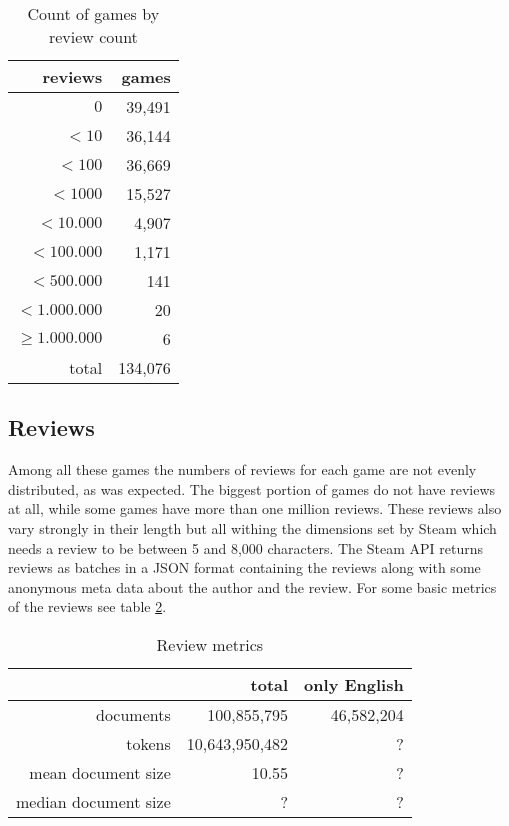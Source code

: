 \documentclass[11pt, a4paper]{article}
\begin{document}
\begin{table}[h]
    \centering
    \begin{tabular}{r|r}
reviews & games \\\hline
    $0$ & 39,491\\
    $< 10$  & 36,144\\
    $< 100$ & 36,669 \\
    $< 1000$ & 15,527\\
    $< 10.000$ & 4,907 \\
    $< 100.000$ & 1,171\\
    $< 500.000$ & 141 \\
    $< 1.000.000$ & 20\\
    $\geq1.000.000$ & 6\\\hline
    total &  134,076
\end{tabular}
    \caption{Count of games by review count}
    \label{tab:game_metrics}
\end{table}


\subsection{Reviews}
Among all these games the numbers of reviews for each game are not evenly distributed, as was expected. The biggest portion of games do not have reviews at all, while some games have more than one million reviews. These reviews also vary strongly in their length but all withing the dimensions set by Steam which needs a review to be between 5 and 8,000 characters. The Steam API returns reviews as batches in a JSON format containing the reviews along with some anonymous meta data about the author and the review. For some basic metrics of the reviews see table \ref{tab:review_metrics}.

\begin{table}[h]
    \centering
    \begin{tabular}{r|r|r}
    & total & only English\\\hline
        documents   &  100,855,795 & 46,582,204\\
        tokens & 10,643,950,482 & ?\\
        mean document size & 10.55 & ?\\
        median document size & ? & ?
    \end{tabular}
    \caption{Review metrics}
    \label{tab:review_metrics}
\end{table}
\end{document}
